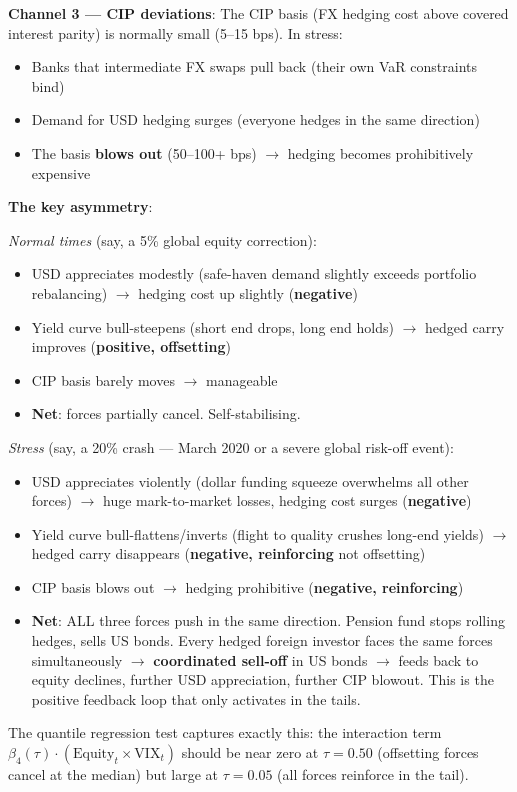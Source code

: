\documentclass[11pt,a4paper]{article}
\begin{document}
\textbf{Channel 3 --- CIP deviations}: The CIP basis (FX hedging cost above covered interest parity) is normally small (5--15 bps). In stress:
\begin{itemize}
\item Banks that intermediate FX swaps pull back (their own VaR constraints bind)
\item Demand for USD hedging surges (everyone hedges in the same direction)
\item The basis \textbf{blows out} (50--100+ bps) $\rightarrow$ hedging becomes prohibitively expensive

\end{itemize}
\textbf{The key asymmetry}:

\textit{Normal times} (say, a 5\% global equity correction):
\begin{itemize}
\item USD appreciates modestly (safe-haven demand slightly exceeds portfolio rebalancing) $\rightarrow$ hedging cost up slightly (\textbf{negative})
\item Yield curve bull-steepens (short end drops, long end holds) $\rightarrow$ hedged carry improves (\textbf{positive, offsetting})
\item CIP basis barely moves $\rightarrow$ manageable
\item \textbf{Net}: forces partially cancel. Self-stabilising.

\end{itemize}
\textit{Stress} (say, a 20\% crash --- March 2020 or a severe global risk-off event):
\begin{itemize}
\item USD appreciates violently (dollar funding squeeze overwhelms all other forces) $\rightarrow$ huge mark-to-market losses, hedging cost surges (\textbf{negative})
\item Yield curve bull-flattens/inverts (flight to quality crushes long-end yields) $\rightarrow$ hedged carry disappears (\textbf{negative, reinforcing} not offsetting)
\item CIP basis blows out $\rightarrow$ hedging prohibitive (\textbf{negative, reinforcing})
\item \textbf{Net}: ALL three forces push in the same direction. Pension fund stops rolling hedges, sells US bonds. Every hedged foreign investor faces the same forces simultaneously $\rightarrow$ \textbf{coordinated sell-off} in US bonds $\rightarrow$ feeds back to equity declines, further USD appreciation, further CIP blowout. This is the positive feedback loop that only activates in the tails.

\end{itemize}
The quantile regression test captures exactly this: the interaction term $\beta_4(\tau) \cdot (\text{Equity}_t \times \text{VIX}_t)$ should be near zero at $\tau = 0.50$ (offsetting forces cancel at the median) but large at $\tau = 0.05$ (all forces reinforce in the tail).
\end{document}
